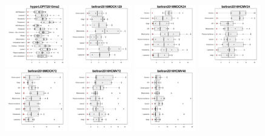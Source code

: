 \documentclass[12pt]{article}\usepackage[]{graphicx}\usepackage[]{color}
\begin{document}
\begin{figure}[p]
  \includegraphics[width = 0.24\textwidth]{./figure/allqseps-6.pdf}
  \includegraphics[width = 0.24\textwidth]{./figure/allqseps-7.pdf}
  \includegraphics[width = 0.24\textwidth]{./figure/allqseps-8.pdf}
  \includegraphics[width = 0.24\textwidth]{./figure/allqseps-9.pdf}
  \includegraphics[width = 0.24\textwidth]{./figure/allqseps-10.pdf}
  \includegraphics[width = 0.24\textwidth]{./figure/allqseps-11.pdf}
  \includegraphics[width = 0.24\textwidth]{./figure/allqseps-12.pdf}

\end{figure}
\end{document}
